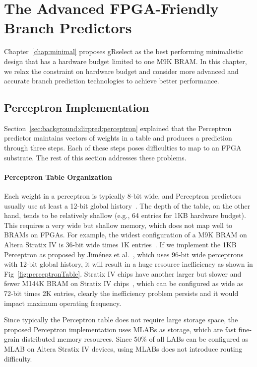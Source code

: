 \chapter{The Advanced FPGA-Friendly Branch Predictors}
\label{chap:advanced}

Chapter~\ref{chap:minimal} proposes gRselect as the best performing minimalistic design that has a hardware budget limited to one M9K BRAM. In this chapter, we relax the constraint on hardware budget and consider more advanced and accurate branch prediction technologies to achieve better performance.

\section{Perceptron Implementation}
\label{sec:advanced:perceptron}
Section~\ref{sec:background:dirpred:perceptron} explained that the Perceptron predictor maintains vectors of weights in a table and produces a prediction through three steps. Each of these steps poses difficulties to map to an FPGA substrate. The rest of this section addresses these problems.

\subsubsection{Perceptron Table Organization}
\label{sec:advanced:perceptron:table}
Each weight in a perceptron is typically 8-bit wide, and Perceptron predictors usually use at least a 12-bit global history~\cite{perceptron}. The depth of the table, on the other hand, tends to be relatively shallow (e.g., 64 entries for 1KB hardware budget). This requires a very wide but shallow memory, which does not map well to BRAMs on FPGAs. For example, the widest configuration of a M9K BRAM on Altera Stratix IV is 36-bit wide times 1K entries~\cite{StratixIVM9K}. If we implement the 1KB Perceptron as proposed by Jim\'enez et al.~\cite{perceptron}, which uses 96-bit wide perceptrons with 12-bit global history, it will result in a huge resource inefficiency as shown in Fig~\ref{fig:perceptronTable}. Stratix IV chips have another larger but slower and fewer M144K BRAM on Stratix IV chips~\cite{StratixIVM9K}, which can be configured as wide as 72-bit times 2K entries, clearly the inefficiency problem persists and it would impact maximum operating frequency.

Since typically the Perceptron table does not require large storage space, the proposed Perceptron implementation uses MLABs as storage, which are fast fine-grain distributed memory resources. Since 50\% of all LABs can be configured as MLAB on Altera Stratix IV devices, using MLABs does not introduce routing difficulty.


